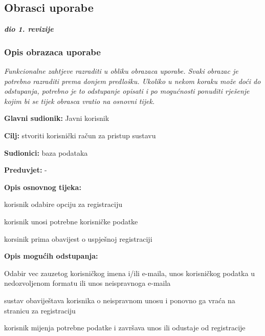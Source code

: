 \eject 



\subsection{Obrasci uporabe}

\textbf{\textit{dio 1. revizije}}

\subsubsection{Opis obrazaca uporabe}
\textit{Funkcionalne zahtjeve razraditi u obliku obrazaca uporabe. Svaki obrazac je potrebno razraditi prema donjem predlošku. Ukoliko u nekom koraku može doći do odstupanja, potrebno je to odstupanje opisati i po mogućnosti ponuditi rješenje kojim bi se tijek obrasca vratio na osnovni tijek.}\\


\noindent {}
\begin{packed_item}
	\item \textbf{Glavni sudionik: } Javni korisnik
	\item  \textbf{Cilj:} stvoriti korisnički račun za pristup sustavu
	\item  \textbf{Sudionici:} baza podataka
	\item  \textbf{Preduvjet:} -
	\item  \textbf{Opis osnovnog tijeka:}
	
	\item[] \begin{packed_enum}
		
		\item korisnik odabire opciju za registraciju
		\item korisnik unosi potrebne korisničke podatke
		\item korsinik prima obavijest o uspješnoj registraciji
	\end{packed_enum}
	
	\item  \textbf{Opis mogućih odstupanja:}
	
	\item[] \begin{packed_item}
		
		\item[2.a] Odabir vec zauzetog korisničkog imena i/ili e-maila, unos korisničkog podatka u nedozvoljenom formatu ili unos neispravnoga e-maila 
		\item[] \begin{packed_enum}
			
			\item sustav obaviještava korisnika o neispravnom unosu i ponovno ga vraća na stranicu za registraciju
			\item korisnik mijenja potrebne podatke i završava unos ili odustaje od registracije
			
		\end{packed_enum}
	\end{packed_item}
\end{packed_item}


